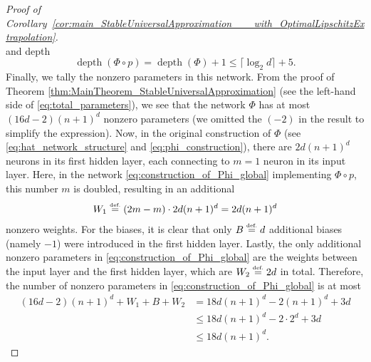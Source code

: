 \documentclass{article}
\numberwithin{equation}{section}
\theoremstyle{definition}
\newcommand{\eqdef}{\ensuremath{\stackrel{\mbox{\upshape\tiny def.}}{=}}}
\begin{document}
\begin{proof}[{Proof of Corollary~\ref{cor:main_StableUniversalApproximation___with_OptimalLipschitzExtrapolation}}]
\[\]
and depth
\[
    \operatorname{depth}(\Phi\circ p)
    =
    \operatorname{depth}(\Phi) + 1
    \le
    \lceil \log_2{d} \rceil + 5
    .
\]
Finally, we tally the nonzero parameters in this network. From the proof of Theorem \ref{thm:MainTheorem_StableUniversalApproximation} (see the left-hand side of \eqref{eq:total_parameters}), we see that the network $\Phi$ has at most $(16d-2)(n+1)^d$ nonzero parameters (we omitted the $(-2)$ in the result to simplify the expression). Now, in the original construction of $\Phi$ (see \eqref{eq:hat_network_structure} and \eqref{eq:phi_construction}), there are $2d(n+1)^d$ neurons in its first hidden layer, each connecting to $m=1$ neuron in its input layer. Here, in the network \eqref{eq:construction_of_Phi_global} implementing $\Phi\circ p$, this number $m$ is doubled, resulting in an additional
\[
    W_1 
    \eqdef 
    (2m-m) \cdot 2d(n+1)^d 
    =
    2d(n+1)^d
\]
nonzero weights. For the biases, it is clear that only $B \eqdef d$ additional biases (namely $-1$) were introduced in the first hidden layer. Lastly, the only additional nonzero parameters in \eqref{eq:construction_of_Phi_global} are the weights between the input layer and the first hidden layer, which are $W_2 \eqdef 2d$ in total. Therefore, the number of nonzero parameters in \eqref{eq:construction_of_Phi_global} is at most 
\begin{align*}
    (16d-2)(n+1)^d + W_1 + B + W_2
    &=
    18d(n+1)^d - 2(n+1)^d + 3d
    \\
    &\le
    18d(n+1)^d - 2 \cdot 2^d + 3d
    \\
    &\le
    18d(n+1)^d.
\end{align*}
\end{proof}
\end{document}
